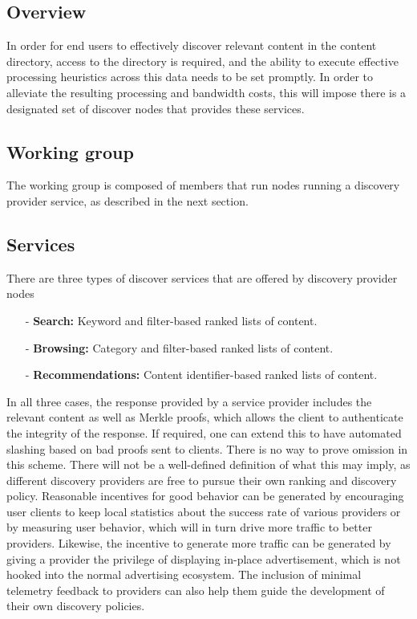 \documentclass{article}
\begin{document}
\subsection{Overview}
In order for end users to effectively discover relevant content in the content directory, access to the directory is required, and the ability to execute effective processing heuristics across this data needs to be set promptly. In order to alleviate the resulting processing and bandwidth costs, this will impose there is a designated set of discover nodes that provides these services.

\subsection{Working group}

The working group is composed of members that run nodes running a discovery provider service, as described in the next section.

\subsection{Services}

There are three types of discover services that are offered by discovery provider nodes

\begin{enumerate}
    \item[-] \textbf{Search:} Keyword and filter-based ranked lists of content.
    \item[-] \textbf{Browsing:} Category and filter-based ranked lists of content.
    \item[-] \textbf{Recommendations:} Content identifier-based ranked lists of content.
\end{enumerate}

In all three cases, the response provided by a service provider includes the relevant content as well as Merkle proofs, which allows the client to authenticate the integrity of the response. If required, one can extend this to have automated slashing based on bad proofs sent to clients. There is no way to prove omission in this scheme. There will not be a well-defined definition of what this may imply, as different discovery providers are free to pursue their own ranking and discovery policy. Reasonable incentives for good behavior can be generated by encouraging user clients to keep local statistics about the success rate of various providers or by measuring user behavior, which will in turn drive more traffic to better providers. Likewise, the incentive to generate more traffic can be generated by giving a provider the privilege of displaying in-place advertisement, which is not hooked into the normal advertising ecosystem. The inclusion of minimal telemetry feedback to providers can also help them guide the development of their own discovery policies.
\end{document}
